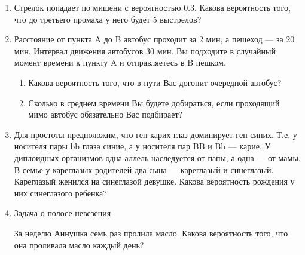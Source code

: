 \documentclass[nobib]{tufte-handout}
\begin{document}
\begin{enumerate}
\item Стрелок попадает по мишени с вероятностью 0.3. Какова вероятность того, что до третьего промаха у него будет 5 выстрелов?

\item Расстояние от пункта A до B автобус проходит за 2 мин, а пешеход — за 20 мин. Интервал движения автобусов 30 мин. Вы подходите в случайный момент времени к пункту A и отправляетесь в B пешком. 

\begin{enumerate}
\item Какова вероятность того, что в пути Вас догонит очередной автобус?
\item Сколько в среднем времени Вы будете добираться, если проходящий мимо автобус обязательно Вас подбирает?
\end{enumerate}



\item Для простоты предположим, что ген карих глаз доминирует ген синих. Т.е. у носителя пары bb глаза синие, а у носителя пар BB и Bb --- карие. У диплоидных
организмов  одна аллель наследуется от папы, а одна --- от мамы. В семье у кареглазых родителей два сына --- кареглазый и
синеглазый. Кареглазый женился на синеглазой девушке. Какова
вероятность рождения у них синеглазого ребенка?


\item Задача о полосе невезения

За неделю Аннушка семь раз пролила масло. Какова вероятность того, что она проливала масло каждый день?



\end{enumerate}
\end{document}
